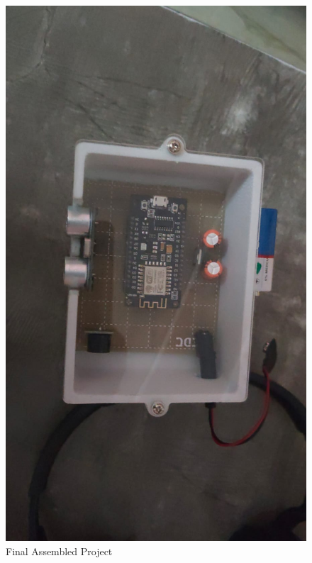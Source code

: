 \documentclass[12pt]{article}
\begin{document}
\begin{figure}[H]
\centering
    \includegraphics[scale=0.20]{final2.jpg}
    \caption{Final Assembled Project}
\end{figure}
\end{document}
